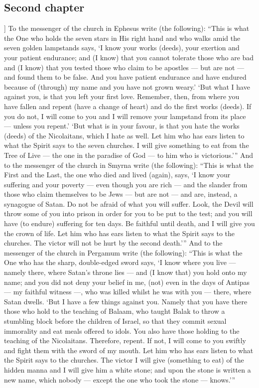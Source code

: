\begin{pages}
\begin{Rightside}
        			\chapter*{Second chapter}
				]
			To the messenger of the church in Ephesus write (the following): “This is what the One who holds the seven stars in His right hand and who walks amid the seven golden lampstands says, ‘I know your works (deeds), your exertion and your patient endurance; and (I know) that you cannot tolerate those who are bad and (I know) that you tested those who claim to be apostles — but are not — and found them to be false. And you have patient endurance and have endured because of (through) my name and you have not grown weary.’ 
		\pend
		\pstart
			‘But what I have against you, is that you left your first love. Remember, then, from where you have fallen and repent (have a change of heart) and do the first works (deeds). If you do not, I will come to you and I will remove your lampstand from its place — unless you repent.’
		\pend
		\pstart
			‘But what is in your favour, is that you hate the works (deeds) of the Nicolaitans, which I hate as well. Let him who has ears listen to what the Spirit says to the seven churches. I will give something to eat from the Tree of Live — the one in the paradise of God — to him who is victorious.’”
		\pend
		\pstart
			And to the messenger of the church in Smyrna write (the following): “This is what the First and the Last, the one who died and lived (again), says, ‘I know your suffering and your poverty — even though you are rich — and the slander from those who claim themselves to be Jews — but are not — and are, instead, a synagogue of Satan. Do not be afraid of what you will suffer. Look, the Devil will throw some of you into prison in order for you to be put to the test; and you will have (to endure) suffering for ten days. Be faithful until death, and I will give you the crown of life. Let him who has ears listen to what the Spirit says to the churches. The victor will not be hurt by the second death.’”
		\pend
		\pstart
			And to the messenger of the church in Pergamum write (the following): “This is what the One who has the sharp, double-edged sword says, ‘I know where you live — namely there, where Satan’s throne lies — and (I know that) you hold onto my name; and you did not deny your belief in me, (not) even in the days of Antipas — my faithful witness —, who was killed whilst he was with you — there, where Satan dwells.
		\pend
		\pstart
			‘But I have a few things against you. Namely that you have there those who hold to the teaching of Balaam, who taught Balak to throw a stumbling block before the children of Israel, so that they commit sexual immorality and eat meals offered to idols. You also have those holding to the teaching of the Nicolaitans. Therefore, repent. If not, I will come to you swiftly and fight them with the sword of my mouth. Let him who has ears listen to what the Spirit says to the churches. The victor I will give (something to eat) of the hidden manna and I will give him a white stone; and upon the stone is written a new name, which nobody — except the one who took the stone — knows.’”

\end{Rightside}
\end{pages}
